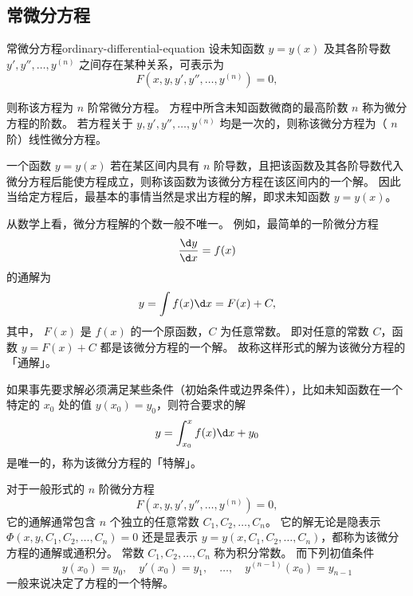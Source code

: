\subsection{常微分方程}\label{subsec:ordinary-differential-equation}

\begin{definition}{常微分方程}{ordinary-differential-equation}
    设未知函数 $ y = y(x) $ 及其各阶导数 $ y', y'', \ldots , y^{(n)} $ 之间存在某种关系，可表示为
    \begin{equation}
        F(x, y, y', y'', \ldots , y^{(n)}) = 0,
    \end{equation}

    则称该方程为 $ n $ 阶常微分方程。
    方程中所含未知函数微商的最高阶数 $ n $ 称为微分方程的阶数。
    若方程关于 $ y , y', y'', \ldots , y^{(n)} $ 均是一次的，则称该微分方程为（ $ n $ 阶）线性微分方程。
\end{definition}

一个函数 $ y = y(x) $ 若在某区间内具有 $ n $ 阶导数，且把该函数及其各阶导数代入微分方程后能使方程成立，则称该函数为该微分方程在该区间内的一个解。
因此当给定方程后，最基本的事情当然是求出方程的解，即求未知函数 $ y = y(x) $。

从数学上看，微分方程解的个数一般不唯一。
例如，最简单的一阶微分方程
\begin{equation}
    \frac{\d y}{\d x} = f(x)
\end{equation}
的通解为
\begin{equation}
    y = \int f(x) \d x = F(x) + C,
\end{equation}
其中， $ F(x) $ 是 $ f(x) $ 的一个原函数，$ C $ 为任意常数。
即对任意的常数 $ C $，函数 $ y = F(x) + C $ 都是该微分方程的一个解。
故称这样形式的解为该微分方程的「通解」。

如果事先要求解必须满足某些条件（初始条件或边界条件），比如未知函数在一个特定的 $ x_0 $ 处的值 $ y(x_0) = y_0 $，则符合要求的解
\begin{equation}
    y = \int_{x_0}^{x} f(x) \d x + y_0
\end{equation}
是唯一的，称为该微分方程的「特解」。

对于一般形式的 $ n $ 阶微分方程
\begin{equation}
    F(x, y, y', y'', \ldots , y^{(n)}) = 0,
\end{equation}
它的通解通常包含 $ n $ 个独立的任意常数 $ C_1, C_2, \ldots , C_n $。
它的解无论是隐表示 $ \Phi (x, y, C_1, C_2, \ldots , C_n) = 0 $ 还是显表示 $ y = y(x, C_1, C_2, \ldots , C_n) $，都称为该微分方程的通解或通积分。
常数 $ C_1, C_2, \ldots , C_n $ 称为积分常数。
而下列初值条件
\begin{equation}
    y(x_0) = y_0, \quad y'(x_0) = y_1, \quad \ldots , \quad y^{(n-1)}(x_0) = y_{n-1}
\end{equation}
一般来说决定了方程的一个特解。

